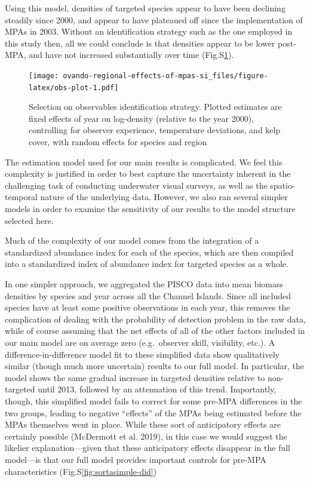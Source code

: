 \documentclass[]{article}
\begin{document}
Using this model, densities of targeted species appear to have been declining steadily since 2000, and appear to have plateaued off since the implementation of MPAs in 2003. Without an identification strategy such as the one employed in this study then, all we could conclude is that densities appear to be lower post-MPA, and have not increased substantially over time (Fig.S\ref{fig:obs-plot}).

\begin{figure}
\centering
\texttt{[image: ovando-regional-effects-of-mpas-si\_files/figure-latex/obs-plot-1.pdf]}
\caption{\label{fig:obs-plot}Selection on observables identification strategy. Plotted estimates are fixed effects of year on log-density (relative to the year 2000), controlling for observer experience, temperature deviations, and kelp cover, with random effects for species and region}
\end{figure}

The estimation model used for our main results is complicated. We feel this complexity is justified in order to best capture the uncertainty inherent in the challenging task of conducting underwater visual surveys, as well as the spatio-temporal nature of the underlying data. However, we also ran several simpler models in order to examine the sensitivity of our results to the model structure selected here.

Much of the complexity of our model comes from the integration of a standardized abundance index for each of the species, which are then compiled into a standardized index of abundance index for targeted species as a whole.

In one simpler approach, we aggregated the PISCO data into mean biomass densities by species and year across all the Channel Islands. Since all included species have at least some positive observations in each year, this removes the complication of dealing with the probability of detection problem in the raw data, while of course assuming that the net effects of all of the other factors included in our main model are on average zero (e.g.~observer skill, visibility, etc.). A difference-in-difference model fit to these simplified data show qualitatively similar (though much more uncertain) results to our full model. In particular, the model shows the same gradual increase in targeted densities relative to non-targeted until 2013, followed by an attenuation of this trend. Importantly, though, this simplified model fails to correct for some pre-MPA differences in the two groups, leading to negative ``effects'' of the MPAs being estimated before the MPAs themselves went in place. While these sort of anticipatory effects are certainly possible (McDermott et al. 2019), in this case we would suggest the likelier explanation---given that these anticipatory effects disappear in the full model---is that our full model provides important controls for pre-MPA characteristics (Fig.S\ref{fig:sortasimple-did})
\end{document}
